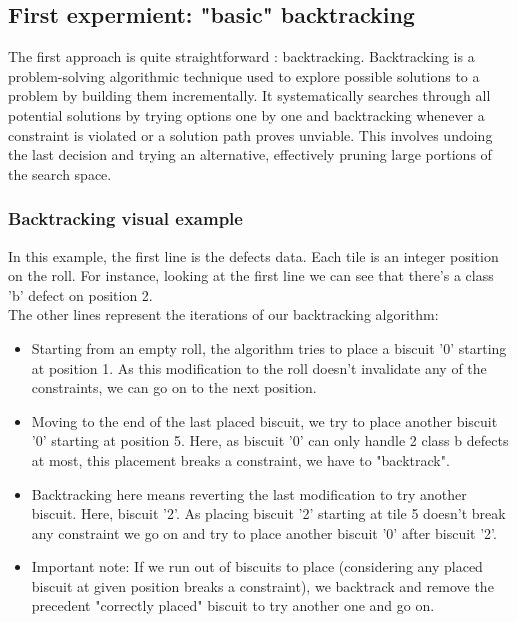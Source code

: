\documentclass{modeleRapport}
\begin{document}
\newpage


\subsection{First expermient: "basic" backtracking}

The first approach is quite straightforward : backtracking. Backtracking is a problem-solving algorithmic 
technique used to explore possible solutions to a problem by building them incrementally. 
It systematically searches through all potential solutions by trying options one by one and backtracking whenever 
a constraint is violated or a solution path proves unviable. This involves undoing the last decision and 
trying an alternative, effectively pruning large portions of the search space.\\

\subsubsection{Backtracking visual example}

In this example, the first line is the defects data. Each tile is an integer position on the roll. 
For instance, looking at the first line we can see that there's a class 'b' defect on position 2.\\
The other lines represent the iterations of our backtracking algorithm:
\begin{itemize}
    \item Starting from an empty roll, the algorithm tries to place a biscuit '0' starting at position 1. 
    As this modification to the roll doesn't invalidate any of the constraints, we can go on to the next position.
    \item Moving to the end of the last placed biscuit, we try to place another biscuit '0' starting at position 5. 
    Here, as biscuit '0' can only handle 2 class b defects at most, this placement breaks a constraint, we have to "backtrack".
    \item Backtracking here means reverting the last modification to try another biscuit. Here, biscuit '2'. 
    As placing biscuit '2' starting at tile 5 doesn't break any constraint we go on and try to place another biscuit '0' 
    after biscuit '2'.
    \item Important note: If we run out of biscuits to place (considering any placed biscuit at given position 
    breaks a constraint), we backtrack and remove the precedent "correctly placed" biscuit to try another one and go on.\\
\end{itemize}
\end{document}
